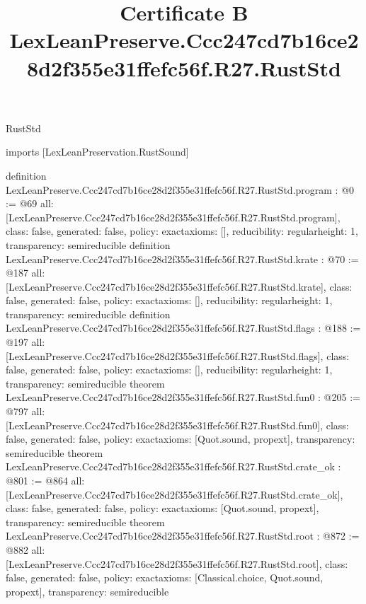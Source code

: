 \begin{lexlean}{RustStd}
\title{Certificate B LexLeanPreserve.Ccc247cd7b16ce28d2f355e31ffefc56f.R27.RustStd}
\begin{coremodule}
imports [LexLeanPreservation.RustSound]

definition LexLeanPreserve.Ccc247cd7b16ce28d2f355e31ffefc56f.R27.RustStd.program : @0 := @69 {
  all: [LexLeanPreserve.Ccc247cd7b16ce28d2f355e31ffefc56f.R27.RustStd.program],
  class: false,
  generated: false,
  policy: exact{axioms: []},
  reducibility: regular{height: 1},
  transparency: semireducible
}
definition LexLeanPreserve.Ccc247cd7b16ce28d2f355e31ffefc56f.R27.RustStd.krate : @70 := @187 {
  all: [LexLeanPreserve.Ccc247cd7b16ce28d2f355e31ffefc56f.R27.RustStd.krate],
  class: false,
  generated: false,
  policy: exact{axioms: []},
  reducibility: regular{height: 1},
  transparency: semireducible
}
definition LexLeanPreserve.Ccc247cd7b16ce28d2f355e31ffefc56f.R27.RustStd.flags : @188 := @197 {
  all: [LexLeanPreserve.Ccc247cd7b16ce28d2f355e31ffefc56f.R27.RustStd.flags],
  class: false,
  generated: false,
  policy: exact{axioms: []},
  reducibility: regular{height: 1},
  transparency: semireducible
}
theorem LexLeanPreserve.Ccc247cd7b16ce28d2f355e31ffefc56f.R27.RustStd.fun0 : @205 := @797 {
  all: [LexLeanPreserve.Ccc247cd7b16ce28d2f355e31ffefc56f.R27.RustStd.fun0],
  class: false,
  generated: false,
  policy: exact{axioms: [Quot.sound, propext]},
  transparency: semireducible
}
theorem LexLeanPreserve.Ccc247cd7b16ce28d2f355e31ffefc56f.R27.RustStd.crate_ok : @801 := @864 {
  all: [LexLeanPreserve.Ccc247cd7b16ce28d2f355e31ffefc56f.R27.RustStd.crate_ok],
  class: false,
  generated: false,
  policy: exact{axioms: [Quot.sound, propext]},
  transparency: semireducible
}
theorem LexLeanPreserve.Ccc247cd7b16ce28d2f355e31ffefc56f.R27.RustStd.root : @872 := @882 {
  all: [LexLeanPreserve.Ccc247cd7b16ce28d2f355e31ffefc56f.R27.RustStd.root],
  class: false,
  generated: false,
  policy: exact{axioms: [Classical.choice, Quot.sound, propext]},
  transparency: semireducible
}


\end{coremodule}
\end{lexlean}

